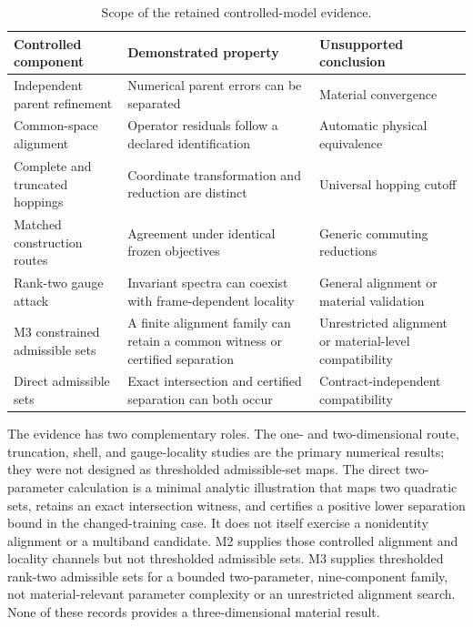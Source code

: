 \documentclass[preprint,12pt]{elsarticle}
\begin{document}
\begin{table}[t]
\centering
\caption{Scope of the retained controlled-model evidence.}
\label{tab:evidence-scope}
\begin{tabular}{@{}
>{\raggedright\arraybackslash}p{}
>{\raggedright\arraybackslash}p{}
>{\raggedright\arraybackslash}p{}@{}}
\toprule
Controlled component & Demonstrated property & Unsupported conclusion \\
\midrule
Independent parent refinement
& Numerical parent errors can be separated
& Material convergence \\
Common-space alignment
& Operator residuals follow a declared identification
& Automatic physical equivalence \\
Complete and truncated hoppings
& Coordinate transformation and reduction are distinct
& Universal hopping cutoff \\
Matched construction routes
& Agreement under identical frozen objectives
& Generic commuting reductions \\
Rank-two gauge attack
& Invariant spectra can coexist with frame-dependent locality
& General alignment or material validation \\
M3 constrained admissible sets
& A finite alignment family can retain a common witness or certified separation
& Unrestricted alignment or material-level compatibility \\
Direct admissible sets
& Exact intersection and certified separation can both occur
& Contract-independent compatibility \\
\bottomrule
\end{tabular}
\end{table}

The evidence has two complementary roles. The one- and two-dimensional route,
truncation, shell, and gauge-locality studies are the primary numerical results;
they were not designed as thresholded admissible-set maps. The direct
two-parameter calculation is a minimal analytic illustration that maps two
quadratic sets, retains an exact intersection witness, and certifies a positive
lower separation bound in the changed-training case. It does not itself exercise a
nonidentity alignment or a multiband candidate. M2 supplies those controlled
alignment and locality channels but not thresholded admissible sets. M3
supplies thresholded rank-two admissible sets for a bounded two-parameter,
nine-component family, not material-relevant parameter complexity or an
unrestricted alignment search. None of these records provides a
three-dimensional material result.
\end{document}
